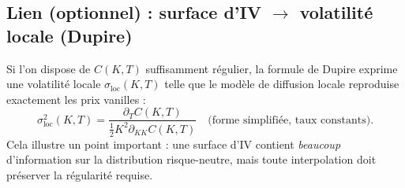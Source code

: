 \documentclass[11pt,a4paper]{report}
\theoremstyle{definition}
\theoremstyle{plain}
\theoremstyle{remark}
\newcommand{\1}{\mathbf{1}}
\begin{document}
\subsection*{Lien (optionnel) : surface d'IV $\to$ volatilité locale (Dupire)}
Si l'on dispose de $C(K,T)$ suffisamment régulier, la formule de Dupire exprime une volatilité locale $\sigma_{\text{loc}}(K,T)$ telle que le modèle de diffusion locale reproduise exactement les prix vanilles :
\[
\sigma_{\text{loc}}^2(K,T)=\frac{\partial_T C(K,T)}{\tfrac12 K^2 \partial_{KK} C(K,T)}\quad \text{(forme simplifiée, taux constants)}.
\]
Cela illustre un point important : une surface d'IV contient \emph{beaucoup} d'information sur la distribution risque-neutre, mais toute interpolation doit préserver la régularité requise.


\end{document}
